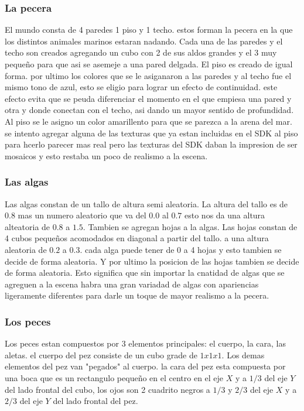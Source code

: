 \documentclass[10pt, a4paper, twocolumn]{article}
\begin{document}
\subsubsection{La pecera}

El mundo consta de 4 paredes 1 piso y 1 techo. estos forman la pecera en la que los distintos animales marinos estaran nadando.
Cada una de las paredes y el techo son creados agregando un cubo con 2 de sus aldos grandes y el 3 muy pequeño para que asi se asemeje a una pared delgada. El piso es creado de igual forma. por ultimo los colores que se le asiganaron a las paredes y al techo fue el mismo tono de azul, esto se eligio para lograr un efecto de continuidad. este efecto evita que se peuda diferenciar el momento en el que empiesa una pared y otra y donde conectan con el techo, asi dando un mayor sentido de profundidad.
Al piso se le asigno un color amarillento para que se parezca a la arena del mar. 
se intento agregar alguna de las texturas que ya estan incluidas en el SDK al piso para hcerlo parecer mas real pero las texturas del SDK daban la impresion de ser mosaicos y esto restaba un poco de realismo a la escena.  

\subsubsection{Las algas}
Las algas constan de un tallo de altura semi aleatoria. La altura del tallo es de 0.8 mas un numero aleatorio que va del $0.0$ al $0.7$ esto nos da una altura alteatoria de $0.8$ a $1.5$. Tambien se agregan hojas a la algas. Las hojas constan de 4 cubos pequeños acomodados en diagonal a partir del tallo. a una altura aleatoria de $0.2$ a $0.3$. cada alga puede tener de 0 a 4 hojas y esto tambien se decide de forma aleatoria. Y por ultimo la posicion de las hojas tambien se decide de forma aleatoria. Esto significa que sin importar la cnatidad de algas que se agreguen a la escena habra una gran variadad de algas con apariencias ligeramente diferentes para darle un toque de mayor realismo a la pecera.

\subsubsection{Los peces}
Los peces estan compuestos por 3 elementos principales: el cuerpo, la cara, las aletas. el cuerpo del pez consiste de un cubo grade de $1x1x1$. Los demas elementos del pez van "pegados" al cuerpo. la cara del pez esta compuesta por una boca que es un rectangulo pequeño en el centro en el eje $X$ y a $1/3$ del eje $Y$ del lado frontal del cubo, los ojos son 2 cuadrito negros a $1/3$ y $2/3$ del eje $X$ y a $2/3$ del eje $Y$ del lado frontal del pez. 
\end{document}
